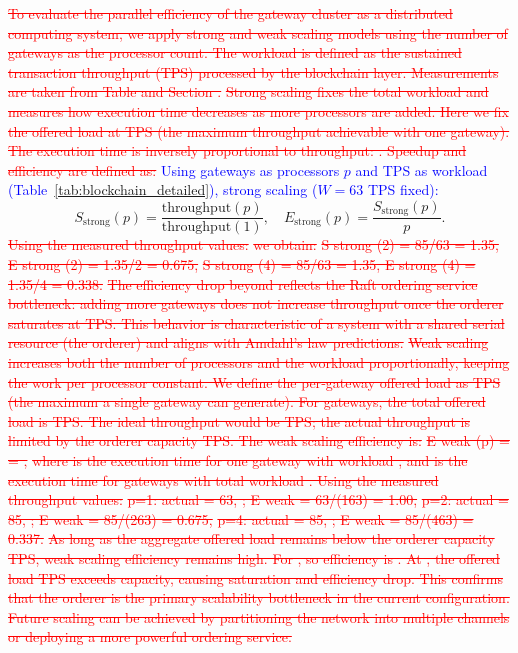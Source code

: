 \documentclass[pdflatex,sn-mathphys-num]{sn-jnl}
\theoremstyle{thmstyleone}
\theoremstyle{thmstyletwo}
\theoremstyle{thmstylethree}
\begin{document}
{\textcolor{red}{\sout{To evaluate the parallel efficiency of the gateway cluster as a distributed computing system, we apply strong and weak scaling models using the number of gateways as the processor count. The workload is defined as the sustained transaction throughput (TPS) processed by the blockchain layer. Measurements are taken from Table and Section .}}
\textcolor{red}{\sout{Strong scaling fixes the total workload and measures how execution time decreases as more processors are added. Here we fix the offered load at TPS (the maximum throughput achievable with one gateway). The execution time is inversely proportional to throughput: . Speedup and efficiency are defined as:}}
\textcolor{blue}{Using gateways as processors $p$ and TPS as workload (Table~\ref{tab:blockchain_detailed}), strong scaling ($W=63$ TPS fixed):}
\begin{equation}
S_{\text{strong}}(p) = \frac{\text{throughput}(p)}{\text{throughput}(1)}, \quad E_{\text{strong}}(p) = \frac{S_{\text{strong}}(p)}{p}.
\end{equation}
\textcolor{red}{\sout{Using the measured throughput values:}}
\textcolor{red}{\sout{we obtain:}}
\textcolor{red}{\sout{S strong (2) = 85/63 = 1.35, E strong (2) = 1.35/2 = 0.675,}}
\textcolor{red}{\sout{S strong (4) = 85/63 = 1.35, E strong (4) = 1.35/4 = 0.338.}}
\textcolor{red}{\sout{The efficiency drop beyond reflects the Raft ordering service bottleneck: adding more gateways does not increase throughput once the orderer saturates at TPS. This behavior is characteristic of a system with a shared serial resource (the orderer) and aligns with Amdahl's law predictions.}}
\textcolor{red}{\sout{Weak scaling increases both the number of processors and the workload proportionally, keeping the work per processor constant. We define the per‑gateway offered load as TPS (the maximum a single gateway can generate). For gateways, the total offered load is TPS. The ideal throughput would be TPS; the actual throughput is limited by the orderer capacity TPS. The weak scaling efficiency is:}}
\textcolor{red}{\sout{E weak (p) = = ,}}
\textcolor{red}{\sout{where is the execution time for one gateway with workload , and is the execution time for gateways with total workload . Using the measured throughput values:}}
\textcolor{red}{\sout{p=1: actual = 63, ; E weak = 63/(163) = 1.00,}}
\textcolor{red}{\sout{p=2: actual = 85, ; E weak = 85/(263) = 0.675,}}
\textcolor{red}{\sout{p=4: actual = 85, ; E weak = 85/(463) = 0.337.}}
\textcolor{red}{\sout{As long as the aggregate offered load remains below the orderer capacity TPS, weak scaling efficiency remains high. For , so efficiency is . At , the offered load TPS exceeds capacity, causing saturation and efficiency drop. This confirms that the orderer is the primary scalability bottleneck in the current configuration. Future scaling can be achieved by partitioning the network into multiple channels or deploying a more powerful ordering service.}}
}
\end{document}
